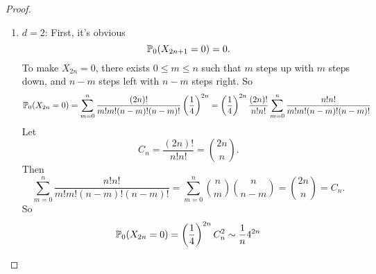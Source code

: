 \begin{exam}
\begin{proof}
\begin{enumerate}[label=(\roman{*})]
            \item $d = 2$: First, it's obvious
            \begin{equation*}
                \mathbb{P}_0(X_{2n+1} = 0) = 0.
            \end{equation*}
            To make $X_{2n} = 0$, there exists $0 \leq m \leq n$ such that $m$ steps up with $m$ steps down, and $n-m$ steps left with $n-m$ steps right. So
            \begin{equation*}
                \mathbb{P}_0(X_{2n} = 0) = \sum_{m=0}^n\frac{(2n)!}{m!m!(n-m)!(n-m)!} \left(\frac{1}{4}\right)^{2n} =  \left(\frac{1}{4}\right)^{2n}\frac{(2n)!}{n!n!}\sum_{m=0}^n\frac{n!n!}{m!m!(n-m)!(n-m)!}
            \end{equation*}
            Let
            \begin{equation*}
                C_n = \frac{(2n)!}{n!n!} = \binom{2n}{n}.
            \end{equation*}
            Then
            \begin{equation*}
                \sum_{m=0}^n\frac{n!n!}{m!m!(n-m)!(n-m)!} = \sum_{m=0}^n \binom{n}{m}\binom{n}{n-m} = \binom{2n}{n} = C_n.
            \end{equation*}
            So
            \begin{equation*}
                \mathbb{P}_0(X_{2n} = 0) = \left(\frac{1}{4}\right)^{2n}C_n^2 \sim \frac{1}{n}4^{2n}
            \end{equation*}


\end{enumerate}
\end{proof}
\end{exam}
